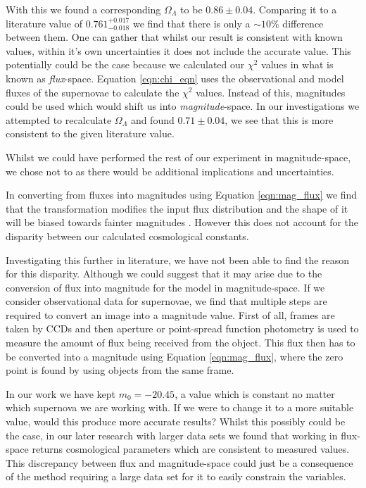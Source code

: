 \documentclass[twocolumn]{revtex4}
\begin{document}
With this we found a corresponding $\Omega_\Lambda$ to be $0.86\pm0.04$. Comparing it to a literature value of $0.761^{+0.017}_{-0.018}$ \cite{cosmo_constraints} we find that there is only a $\sim 10 \%$ difference between them. One can gather that whilst our result is consistent with known values, within it's own uncertainties it does not include the accurate value. This potentially could be the case because we calculated our $\chi^2$ values in what is known as \textit{flux}-space. Equation \ref{eqn:chi_eqn} uses the observational and model fluxes of the supernovae to calculate the $\chi^2$ values. Instead of this, magnitudes could be used which would shift us into \textit{magnitude}-space. In our investigations we attempted to recalculate $\Omega_\Lambda$ and found $0.71\pm0.04$, we see that this is more consistent to the given literature value.

Whilst we could have performed the rest of our experiment in magnitude-space, we chose not to as there would be additional implications and uncertainties.

In converting from fluxes into magnitudes using Equation \ref{eqn:mag_flux} we find that the transformation modifies the input flux distribution and the shape of it will be biased towards fainter magnitudes \cite{magspace_stats}. However this does not account for the disparity between our calculated cosmological constants. 

Investigating this further in literature, we have not been able to find the reason for this disparity. Although we could suggest that it may arise due to the conversion of flux into magnitude for the model in magnitude-space. If we consider observational data for supernovae, we find that multiple steps are required to convert an image into a magnitude value. First of all, frames are taken by CCDs and then aperture or point-spread function photometry is used to measure the amount of flux being received from the object. This flux then has to be converted into a magnitude using Equation \ref{eqn:mag_flux}, where the zero point is found by using objects from the same frame. 


In our work we have kept $m_0=-20.45$, a value which is constant no matter which supernova we are working with. If we were to change it to a more suitable value, would this produce more accurate results? Whilst this possibly could be the case, in our later research with larger data sets we found that working in flux-space returns cosmological parameters which are consistent to measured values. This discrepancy between flux and magnitude-space could just be a consequence of the method requiring a large data set for it to easily constrain the variables.
\end{document}
